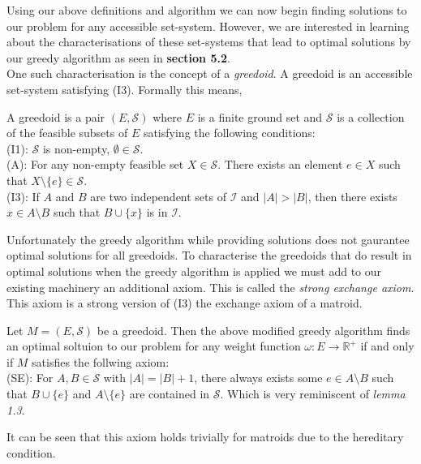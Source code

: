 \documentclass[../main.tex]{subfiles}
\begin{document}
\noindent Using our above definitions and algorithm we can now begin finding solutions to our problem for any accessible set-system. However, we are interested in learning about the characterisations of these set-systems that lead to optimal solutions by our greedy algorithm as seen in \textbf{section 5.2}.\\
One such characterisation is the concept of a \textit{greedoid}. A greedoid is an accessible set-system satisfying (I3). Formally this means,
\begin{defn}
A greedoid is a pair $(E,\mathcal{S})$ where $E$ is a finite ground set and $\mathcal{S}$ is a collection of the feasible subsets of $E$ satisfying the following conditions:\\
(I1): $\mathcal{S}$ is non-empty, $\emptyset \in \mathcal{S}.$\\
(A):  For any non-empty feasible set $X \in \mathcal{S}.$ There exists an element $e \in X$ such that $X \setminus \{e\} \in \mathcal{S}.$\\
(I3): If $ A $ and $ B $ are two independent sets of $\mathcal{I}$ and $|A|>|B|$, then there exists $x \in A \setminus B$ such that $B \cup \{ x \}$ is in $\mathcal{I}.$
\end{defn}
Unfortunately the greedy algorithm while providing solutions does not gaurantee optimal solutions for all greedoids. To characterise the greedoids that do result in optimal solutions when the greedy algorithm is applied we must add to our existing machinery an additional axiom. This is called the \textit{strong exchange axiom}. This axiom is a strong version of (I3) the exchange axiom of a matroid. 
\begin{prop}
Let $M=(E,\mathcal{S})$ be a greedoid. Then the above modified greedy algorithm  finds an optimal soltuion to our problem for any weight function $\omega:E \longrightarrow \mathbb{R^+}$ if and only if $M$ satisfies the follwing axiom:\\
(SE): For $A,B \in \mathcal{S}$ with $|A|=|B|+1$, there always exists some $e \in A \setminus B$ such that $B \cup \{e\}$ and $A \setminus \{e\}$ are contained in $\mathcal{S}.$ Which is very reminiscent of \textit{lemma 1.3}.
\end{prop}
\begin{rem}
It can be seen that this axiom holds trivially for matroids due to the hereditary condition.
\end{rem}
\end{document}

